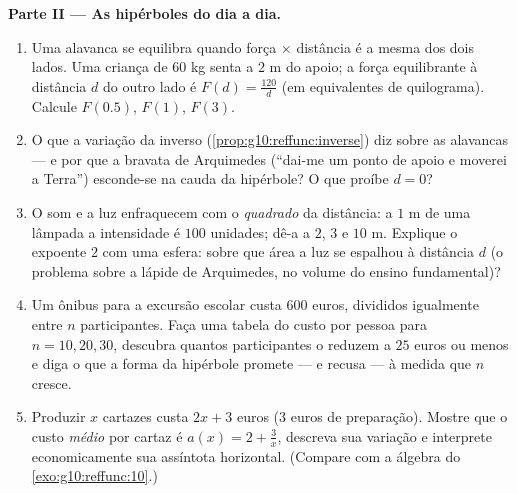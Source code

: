 \begin{problem}
\medskip
\noindent\textbf{Parte II --- As hipérboles do dia a dia.}
\begin{enumerate}[resume]
  \item Uma alavanca se equilibra quando força $\times$ distância
        é a mesma dos dois lados. Uma criança de $60$ kg senta a
        $2$ m do apoio; a força equilibrante à distância $d$ do
        outro lado é $F(d) = \frac{120}{d}$ (em equivalentes de
        quilograma). Calcule $F(0.5)$, $F(1)$, $F(3)$.
  \item O que a variação da  inverso
        (\cref{prop:g10:reffunc:inverse}) diz sobre as
        alavancas --- e por que a bravata de Arquimedes
        (``dai-me um ponto de apoio e moverei a Terra'')
        esconde-se na cauda da hipérbole? O que proíbe $d = 0$?
  \item O som e a luz enfraquecem com o \emph{quadrado} da
        distância: a $1$ m de uma lâmpada a intensidade é $100$
        unidades; dê-a a $2$, $3$ e $10$ m. Explique o expoente
        $2$ com uma esfera: sobre que área a luz se espalhou à
        distância $d$ (o problema sobre a lápide de Arquimedes,
        no volume do ensino fundamental)?
  \item Um ônibus para a excursão escolar custa $600$ euros,
        divididos igualmente entre $n$ participantes. Faça uma
        tabela do custo por pessoa para $n = 10, 20, 30$,
        descubra quantos participantes o reduzem a $25$ euros ou
        menos e diga o que a forma da hipérbole promete --- e
        recusa --- à medida que $n$ cresce.
  \item Produzir $x$ cartazes custa $2x + 3$ euros ($3$ euros de
        preparação). Mostre que o custo \emph{médio} por cartaz é
        $a(x) = 2 + \frac3x$, descreva sua variação e interprete
        economicamente sua assíntota horizontal. (Compare com a
        álgebra do \cref{exo:g10:reffunc:10}.)
\end{enumerate}


\end{problem}
